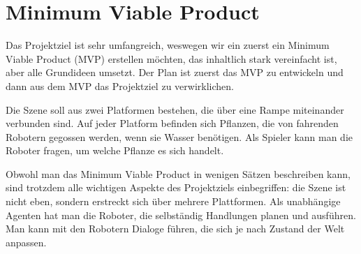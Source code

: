 \section{Minimum Viable Product}

Das Projektziel ist sehr umfangreich, weswegen wir ein zuerst ein Minimum Viable Product (MVP) erstellen möchten, das inhaltlich stark vereinfacht ist, aber alle Grundideen umsetzt. Der Plan ist zuerst das MVP zu entwickeln und dann aus dem MVP das Projektziel zu verwirklichen.

Die Szene soll aus zwei Platformen bestehen, die über eine Rampe miteinander verbunden sind. Auf jeder Platform befinden sich Pflanzen, die von fahrenden Robotern gegossen werden, wenn sie Wasser benötigen. Als Spieler kann man die Roboter fragen, um welche Pflanze es sich handelt.

Obwohl man das Minimum Viable Product in wenigen Sätzen beschreiben kann, sind trotzdem alle wichtigen Aspekte des Projektziels einbegriffen: die Szene ist nicht eben, sondern erstreckt sich über mehrere Plattformen. Als unabhängige Agenten hat man die Roboter, die selbständig Handlungen planen und ausführen. Man kann mit den Robotern Dialoge führen, die sich je nach Zustand der Welt anpassen.
